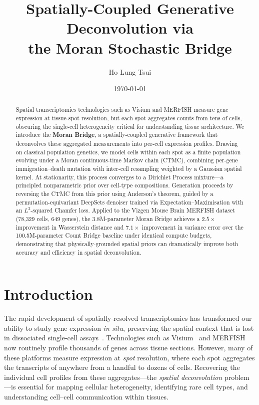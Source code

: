 \documentclass[11pt]{article}
\title{Spatially-Coupled Generative Deconvolution via\\the Moran Stochastic Bridge}
\author{Ho Lung Tsui}
\date{\today}
\begin{document}
\maketitle

\begin{abstract}
Spatial transcriptomics technologies such as Visium and MERFISH measure gene expression at tissue-spot resolution, but each spot aggregates counts from tens of cells, obscuring the single-cell heterogeneity critical for understanding tissue architecture. We introduce the \textbf{Moran Bridge}, a spatially-coupled generative framework that deconvolves these aggregated measurements into per-cell expression profiles. Drawing on classical population genetics, we model cells within each spot as a finite population evolving under a Moran continuous-time Markov chain (CTMC), combining per-gene immigration--death mutation with inter-cell resampling weighted by a Gaussian spatial kernel. At stationarity, this process converges to a Dirichlet Process mixture---a principled nonparametric prior over cell-type compositions. Generation proceeds by reversing the CTMC from this prior using Anderson's theorem, guided by a permutation-equivariant DeepSets denoiser trained via Expectation--Maximisation with an $L^2$-squared Chamfer loss. Applied to the Vizgen Mouse Brain MERFISH dataset (78{,}329 cells, 649 genes), the 3.8M-parameter Moran Bridge achieves a $2.5\times$ improvement in Wasserstein distance and $7.1\times$ improvement in variance error over the 100.5M-parameter Count Bridge baseline under identical compute budgets, demonstrating that physically-grounded spatial priors can dramatically improve both accuracy and efficiency in spatial deconvolution.
\end{abstract}

\section{Introduction}
\label{sec:intro}

The rapid development of spatially-resolved transcriptomics has transformed our ability to study gene expression \emph{in situ}, preserving the spatial context that is lost in dissociated single-cell assays~\citep{moses2022museum}. Technologies such as Visium~\citep{stahl2016visium} and MERFISH~\citep{vizgen2021merfish} now routinely profile thousands of genes across tissue sections. However, many of these platforms measure expression at \emph{spot} resolution, where each spot aggregates the transcripts of anywhere from a handful to dozens of cells. Recovering the individual cell profiles from these aggregates---the \emph{spatial deconvolution} problem---is essential for mapping cellular heterogeneity, identifying rare cell types, and understanding cell--cell communication within tissues.
\end{document}
